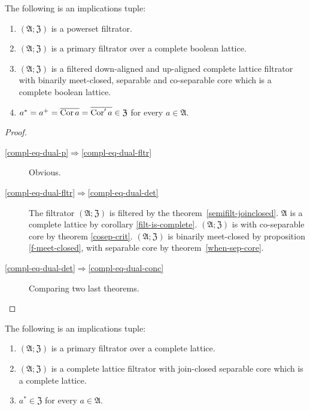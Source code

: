 \begin{thm}
\label{compl-eq-dual}The following is an implications tuple:
\begin{enumerate}
\item \label{compl-eq-dual-p}$(\mathfrak{A};\mathfrak{Z})$ is a powerset
filtrator.
\item \label{compl-eq-dual-fltr}$(\mathfrak{A};\mathfrak{Z})$ is a primary
filtrator over a complete boolean lattice.
\item \label{compl-eq-dual-det}$(\mathfrak{A};\mathfrak{Z})$ is a filtered down-aligned and up-aligned
complete lattice filtrator with binarily meet-closed, separable and
co-separable core which is a complete boolean lattice.
\item \label{compl-eq-dual-conc}$a^{\ast}=a^{+}=\overline{\operatorname{Cor} a}=\overline{\operatorname{Cor}' a}\in\mathfrak{Z}$ for
every $a\in\mathfrak{A}$.
\end{enumerate}
\end{thm}
\begin{proof}
~
\begin{description}
\item [{\ref{compl-eq-dual-p}$\Rightarrow$\ref{compl-eq-dual-fltr}}] Obvious.
\item [{\ref{compl-eq-dual-fltr}$\Rightarrow$\ref{compl-eq-dual-det}}] The
filtrator $(\mathfrak{A};\mathfrak{Z})$ is filtered by the theorem~\ref{semifilt-joinclosed}.
$\mathfrak{A}$ is a complete lattice by corollary \ref{filt-is-complete}.
$(\mathfrak{A};\mathfrak{Z})$ is with co-separable core by theorem
\ref{cosep-crit}.
$(\mathfrak{A};\mathfrak{Z})$ is
binarily meet-closed by proposition \ref{f-meet-closed}, with separable
core by theorem~\ref{when-sep-core}.

\item [{\ref{compl-eq-dual-det}$\Rightarrow$\ref{compl-eq-dual-conc}}] Comparing two last theorems.
\end{description}
\end{proof}
\begin{thm}
\label{compl-in-core}The following is an implications tuple:
\begin{enumerate}
\item \label{compl-in-core-f}$(\mathfrak{A};\mathfrak{Z})$ is a primary
filtrator over a complete lattice.
\item \label{compl-in-core-fltr}$(\mathfrak{A};\mathfrak{Z})$ is a complete
lattice filtrator with join-closed separable core which is a complete
lattice.
\item \label{compl-in-core-conc}$a^{\ast}\in\mathfrak{Z}$ for every $a\in\mathfrak{A}$.
\end{enumerate}
\end{thm}
